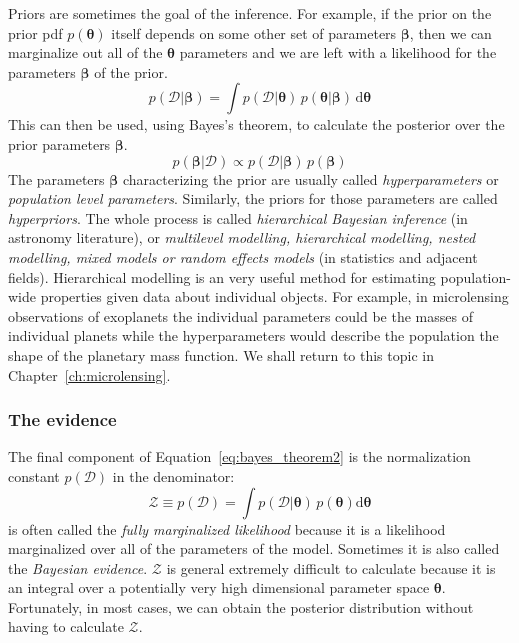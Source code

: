 \documentclass[12pt,dvipsnames]{report}
\newcommand{\ud}{\,\mathrm{d}}
\renewcommand{\vec}[1]{\boldsymbol{\mathbf{#1}}}
\begin{document}
Priors are sometimes the goal of the inference. For example, if the prior on
the prior pdf $p(\vec{\theta})$ itself depends on some other set of parameters
$\vec{\beta}$, then we can marginalize out all of the $\vec{\theta}$ parameters
and we are left with a likelihood for the parameters $\vec{\beta}$ of the
prior.
\begin{equation}
    p(\mathcal{D}\lvert\vec{\beta})=\int p(\mathcal{D}\lvert\vec{\theta})\,p(\vec{\theta}\lvert
    \vec{\beta})\ud \vec{\theta}
\end{equation}
This can then be used, using Bayes's theorem, to calculate the posterior
over the prior parameters $\bm\beta$.
\begin{equation}
    p(\bm\beta\lvert\mathcal{D})\propto p(\mathcal{D}\lvert\vec{\beta})
    \,p(\bm\beta)
\end{equation}
The parameters $\bm\beta$ characterizing the prior are usually called
\emph{hyperparameters} or \emph{population level parameters}. Similarly, the priors
for those parameters are called \emph{hyperpriors}.
The whole process is called \emph{hierarchical Bayesian inference}
(in astronomy literature),  or \emph{multilevel modelling, hierarchical modelling,
    nested modelling, mixed models or random effects models}
(in statistics and adjacent fields).
Hierarchical modelling is an very useful method for estimating
population-wide properties given data about individual objects. For example,
in microlensing observations of exoplanets the individual parameters could be the
masses of individual planets while the hyperparameters would describe the
population the shape of the planetary mass function. We shall return to this topic
in Chapter~\ref{ch:microlensing}.

\subsubsection{The evidence}
The final component of Equation~\ref{eq:bayes_theorem2} is the normalization
constant $ p(\mathcal{D})$ in the denominator:
\begin{equation}
    \mathcal{Z}\equiv p(\mathcal{D})=\int p(\mathcal D\lvert\boldsymbol\theta)\,p(\boldsymbol\theta)\textrm{d}\boldsymbol\theta
    \label{eq:evidence}
\end{equation}
is often called the \textsl{fully marginalized likelihood} because
it is a likelihood marginalized over all of the parameters of the model.
Sometimes
it is also called the \emph{Bayesian evidence}.
$\mathcal{Z}$ is general extremely difficult to calculate because it is an
integral over a potentially very high dimensional parameter space $\vec{\theta}$.
Fortunately, in most cases, we can obtain the posterior distribution without having
to calculate $\mathcal{Z}$.
\end{document}
